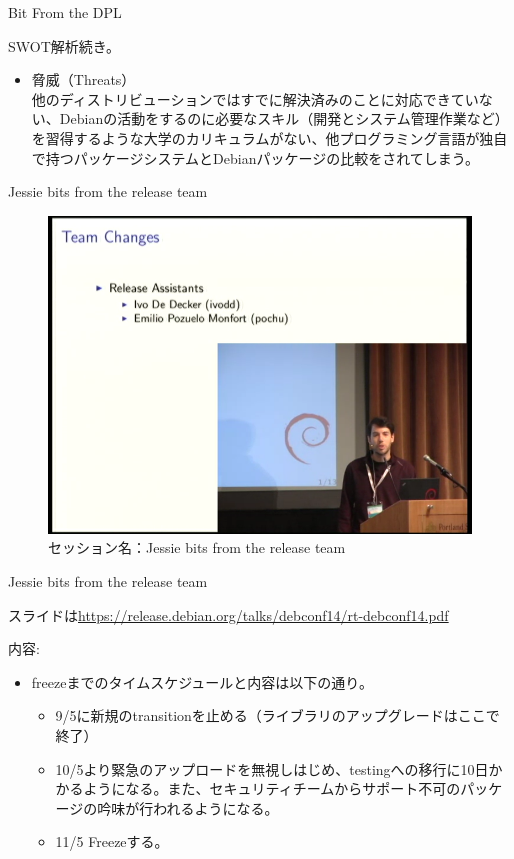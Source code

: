 \begin{frame}{Bit From the DPL}

  SWOT解析続き。

  \begin{itemize}
   \item 脅威（Threats）\\
他のディストリビューションではすでに解決済みのことに対応できていない、Debianの活動をするのに必要なスキル（開発とシステム管理作業など）を習得するような大学のカリキュラムがない、他プログラミング言語が独自で持つパッケージシステムとDebianパッケージの比較をされてしまう。
  \end{itemize}

\end{frame}

\begin{frame}{Jessie bits from the release team}

\begin{figure}[H]
\begin{center}
 \includegraphics[width=0.6\hsize]{image201409/jessie_release.png}
\end{center}
\caption{セッション名：Jessie bits from the release team}
\end{figure}

\end{frame}

\begin{frame}{Jessie bits from the release team}

 スライドは\url{https://release.debian.org/talks/debconf14/rt-debconf14.pdf}

 内容:
 \begin{itemize}
  \item freezeまでのタイムスケジュールと内容は以下の通り。
    \begin{itemize}
    \item 9/5に新規のtransitionを止める（ライブラリのアップグレードはここで終了）
    \item 10/5より緊急のアップロードを無視しはじめ、testingへの移行に10日かかるようになる。また、セキュリティチームからサポート不可のパッケージの吟味が行われるようになる。
    \item 11/5 Freezeする。
    \end{itemize}
\end{itemize}

\end{frame}

